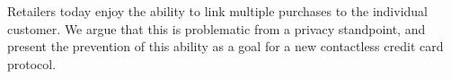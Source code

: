 Retailers today enjoy the ability to link multiple purchases to the individual customer.
We argue that this is problematic from a privacy standpoint,
    and present the prevention of this ability as a goal for a new contactless credit card protocol.